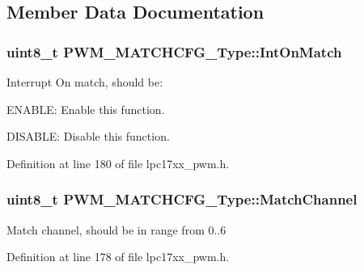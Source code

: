 \subsection{\-Member \-Data \-Documentation}
\hypertarget{struct_p_w_m___m_a_t_c_h_c_f_g___type_ad7a2039a4d607ea0807533df6a5e2e3a}{
\subsubsection[{\-Int\-On\-Match}]{\setlength{\rightskip}{0pt plus 5cm}uint8\-\_\-t {\bf \-P\-W\-M\-\_\-\-M\-A\-T\-C\-H\-C\-F\-G\-\_\-\-Type\-::\-Int\-On\-Match}}}\label{struct_p_w_m___m_a_t_c_h_c_f_g___type_ad7a2039a4d607ea0807533df6a5e2e3a}
\-Interrupt \-On match, should be\-:
\begin{DoxyItemize}
\item \-E\-N\-A\-B\-L\-E\-: \-Enable this function.
\item \-D\-I\-S\-A\-B\-L\-E\-: \-Disable this function. 
\end{DoxyItemize}

\-Definition at line 180 of file lpc17xx\-\_\-pwm.\-h.

\hypertarget{struct_p_w_m___m_a_t_c_h_c_f_g___type_a4308d9be7adabffc225760d3fa91ae62}{
\subsubsection[{\-Match\-Channel}]{\setlength{\rightskip}{0pt plus 5cm}uint8\-\_\-t {\bf \-P\-W\-M\-\_\-\-M\-A\-T\-C\-H\-C\-F\-G\-\_\-\-Type\-::\-Match\-Channel}}}\label{struct_p_w_m___m_a_t_c_h_c_f_g___type_a4308d9be7adabffc225760d3fa91ae62}
\-Match channel, should be in range from 0..6 

\-Definition at line 178 of file lpc17xx\-\_\-pwm.\-h.

